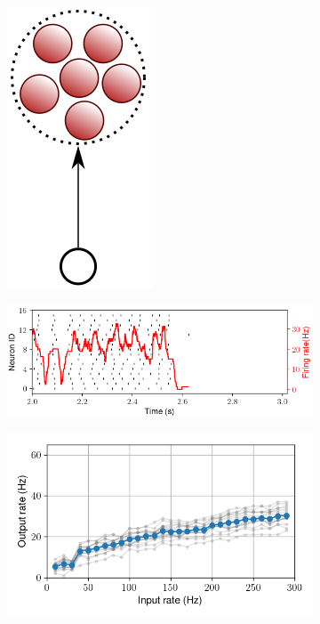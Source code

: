 \begin{figure}[h!]
\begin{subfigure}{.1\textwidth}
    \includegraphics[width=.6\textwidth]{img/chapter4/FF.png}
    \caption{}
    \label{fig:single_cluster_feedforward_sketch}
  \end{subfigure}
    \hfill
  \begin{subfigure}{.5\textwidth}
    \centering
    \includegraphics[width=\textwidth]{img/chapter4/raster_ff.png}
    \caption{}
    \label{fig:single_cluster_feedforward_raster}
  \end{subfigure}
    \hfill
  \begin{subfigure}{.3\textwidth}
    \centering
    \includegraphics[width=\textwidth]{img/chapter4/FF_FF_curves.png}

\end{subfigure}
\end{figure}
